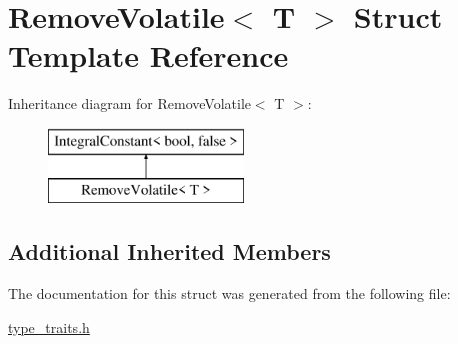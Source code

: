 \hypertarget{struct_remove_volatile}{}\section{Remove\+Volatile$<$ T $>$ Struct Template Reference}
\label{struct_remove_volatile}
Inheritance diagram for Remove\+Volatile$<$ T $>$\+:\begin{figure}[H]
\begin{center}
\leavevmode
\includegraphics[height=2.000000cm]{struct_remove_volatile}
\end{center}
\end{figure}
\subsection*{Additional Inherited Members}


The documentation for this struct was generated from the following file\+:\begin{DoxyCompactItemize}
\item 
\hyperlink{type__traits_8h}{type\+\_\+traits.\+h}\end{DoxyCompactItemize}
